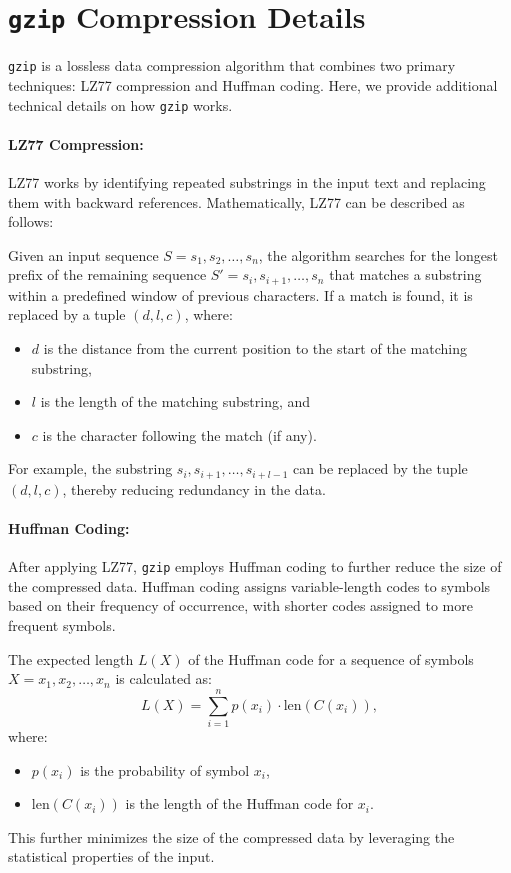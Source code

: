 \section{\texttt{gzip} Compression Details}
\label{app:sec:gzip_compression_details}

\texttt{gzip} is a lossless data compression algorithm that combines two primary techniques: LZ77 compression and Huffman coding. Here, we provide additional technical details on how \texttt{gzip} works.

\paragraph{LZ77 Compression:}
LZ77 works by identifying repeated substrings in the input text and replacing them with backward references. Mathematically, LZ77 can be described as follows:

Given an input sequence \( S = s_1, s_2, \dots, s_n \), the algorithm searches for the longest prefix of the remaining sequence \( S' = s_i, s_{i+1}, \dots, s_n \) that matches a substring within a predefined window of previous characters. If a match is found, it is replaced by a tuple \( (d, l, c) \), where:
\begin{itemize}
    \item \( d \) is the distance from the current position to the start of the matching substring,
    \item \( l \) is the length of the matching substring, and
    \item \( c \) is the character following the match (if any).
\end{itemize}
For example, the substring \( s_i, s_{i+1}, \dots, s_{i+l-1} \) can be replaced by the tuple \( (d, l, c) \), thereby reducing redundancy in the data.

\paragraph{Huffman Coding:}
After applying LZ77, \texttt{gzip} employs Huffman coding to further reduce the size of the compressed data. Huffman coding assigns variable-length codes to symbols based on their frequency of occurrence, with shorter codes assigned to more frequent symbols.

The expected length \( L(X) \) of the Huffman code for a sequence of symbols \( X = x_1, x_2, \dots, x_n \) is calculated as:
\[
L(X) = \sum_{i=1}^{n} p(x_i) \cdot \text{len}(C(x_i)),
\]
where:
\begin{itemize}
    \item \( p(x_i) \) is the probability of symbol \( x_i \),
    \item \( \text{len}(C(x_i)) \) is the length of the Huffman code for \( x_i \).
\end{itemize}
This further minimizes the size of the compressed data by leveraging the statistical properties of the input.

